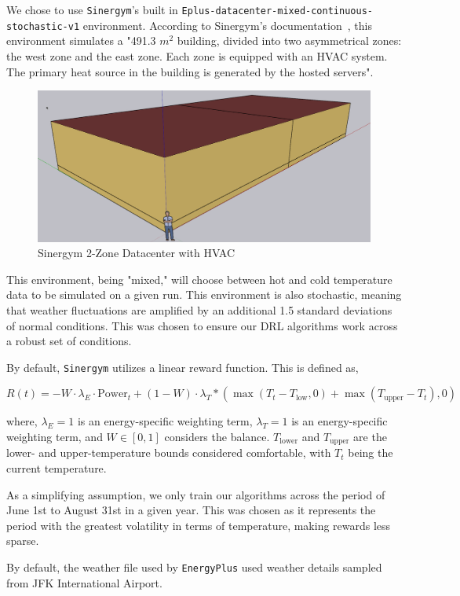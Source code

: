 \documentclass[12pt]{article}
\begin{document}
We chose to use \texttt{Sinergym}'s built in \texttt{Eplus-datacenter-mixed-continuous-stochastic-v1} environment. According to Sinergym's documentation~\cite{sinergym_github}, this environment simulates a "491.3 $m^2$ building, divided into two asymmetrical zones: the west zone and the east zone. Each zone is equipped with an HVAC system. The primary heat source in the building is generated by the hosted servers". 

\begin{figure}[h!]
    \centering
    \includegraphics[width=0.5\linewidth]{images/datacenter.png}
    \caption{Sinergym 2-Zone Datacenter with HVAC}
    \label{fig:datacenter}
\end{figure}

This environment, being "mixed," will choose between hot and cold temperature data to be simulated on a given run. This environment is also stochastic, meaning that weather fluctuations are amplified by an additional 1.5 standard deviations of normal conditions. This was chosen to ensure our DRL algorithms work across a robust set of conditions. 

By default, \texttt{Sinergym} utilizes a linear reward function. This is defined as, 

\[R(t) = -W \cdot \lambda_E \cdot \mathrm{Power}_t + (1 - W) \cdot \lambda_T * (\max(T_t - T_\mathrm{low}, 0) + \max(T_\mathrm{upper} - T_t), 0)\]

where, $\lambda_E = 1$ is an energy-specific weighting term, $\lambda_T = 1$ is an energy-specific weighting term, and $W \in [0, 1]$ considers the balance. $T_\mathrm{lower}$ and $T_\mathrm{upper}$ are the lower- and upper-temperature bounds considered comfortable, with $T_t$ being the current temperature. 

As a simplifying assumption, we only train our algorithms across the period of June 1st to August 31st in a given year. This was chosen as it represents the period with the greatest volatility in terms of temperature, making rewards less sparse. 

By default, the weather file used by \texttt{EnergyPlus} used weather details sampled from JFK International Airport. 
\end{document}
